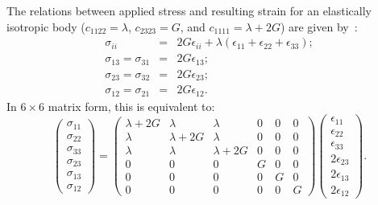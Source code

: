 The relations between applied stress and resulting strain for an elastically isotropic body ($c_{1122}=\lambda$, $c_{2323}=G$, and $c_{1111}=\lambda+2G$) are given by~:
\begin{eqnarray}
\sigma_{ii}&=&2G\epsilon_{ii}+\lambda(\epsilon_{11}+\epsilon_{22}+\epsilon_{33});\nonumber\\
\sigma_{13}=\sigma_{31}&=&2G\epsilon_{13};\nonumber\\
\sigma_{23}=\sigma_{32}&=&2G\epsilon_{23};\nonumber\\
\sigma_{12}=\sigma_{21}&=&2G\epsilon_{12}.\nonumber
\end{eqnarray}
In $6\times 6$ matrix form, this is equivalent to:
\begin{equation}
	\left(\begin{matrix}\sigma_{11}\\\sigma_{22}\\\sigma_{33}\\\sigma_{23}\\\sigma_{13}\\\sigma_{12}\end{matrix}\right) = \left(\begin{matrix}
\lambda+2G & \lambda& \lambda & 0 & 0 & 0\\
\lambda & \lambda+2G & \lambda & 0 & 0 & 0\\
\lambda & \lambda & \lambda+2G & 0 & 0 & 0\\
0 & 0 & 0 & G & 0 & 0\\
0 & 0 & 0 & 0 & G & 0\\
0 & 0 & 0 & 0 & 0 & G\end{matrix}\right)
\left(\begin{matrix}\epsilon_{11}\\ \epsilon_{22}\\ \epsilon_{33}\\ 2\epsilon_{23}\\ 2\epsilon_{13}\\ 2\epsilon_{12}\end{matrix}\right).
\end{equation}

